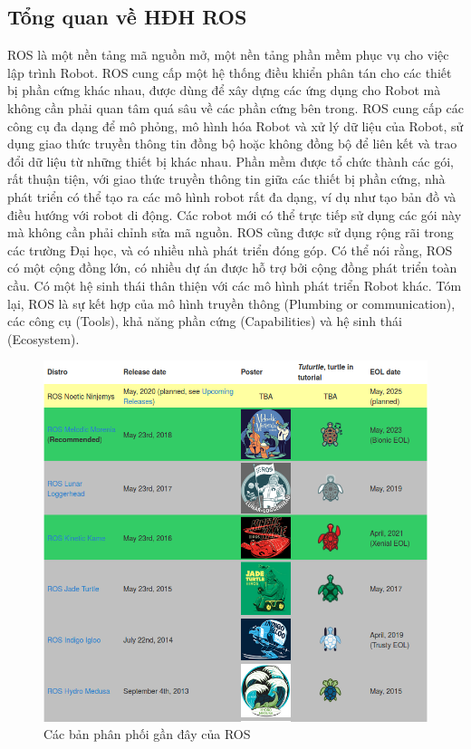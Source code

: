 {\subsection{Tổng quan về HĐH ROS}
ROS là một nền tảng mã nguồn mở, một nền tảng phần mềm phục vụ cho việc
lập trình Robot. ROS cung cấp một hệ thống điều khiển phân tán cho các thiết bị
phần cứng khác nhau, được dùng để xây dựng các ứng dụng cho Robot mà không
cần phải quan tâm quá sâu về các phần cứng bên trong. ROS cung cấp các công cụ
đa dạng để mô phỏng, mô hình hóa Robot và xử lý dữ liệu của Robot, sử dụng giao
thức truyền thông tin đồng bộ hoặc không đồng bộ để liên kết và trao đổi dữ liệu
từ những thiết bị khác nhau.
Phần mềm được tổ chức thành các gói, rất thuận tiện, với giao thức truyền thông tin giữa các thiết bị phần cứng, nhà phát triển có thể tạo ra các mô hình robot
rất đa dạng, ví dụ như tạo bản đồ và điều hướng với robot di động. Các robot mới
có thể trực tiếp sử dụng các gói này mà không cần phải chỉnh sửa mã nguồn.
ROS cũng được sử dụng rộng rãi trong các trường Đại học, và có nhiều nhà phát
triển đóng góp. Có thể nói rằng, ROS có một cộng đồng lớn, có nhiều dự án được
hỗ trợ bởi cộng đồng phát triển toàn cầu. Có một hệ sinh thái thân thiện với các
mô hình phát triển Robot khác.
Tóm lại, ROS là sự kết hợp của mô hình truyền thông (Plumbing or
communication), các công cụ (Tools), khả năng phần cứng (Capabilities) và hệ
sinh thái (Ecosystem).

\begin{figure}[htbp]
  \centering
  \includegraphics[width=0.9\linewidth]{figures/ROS-ditributions.png}
  \caption{Các bản phân phối gần đây của ROS \cite{wikiros}}
  \label{fig:ROS-distributions}
\end{figure}

}
